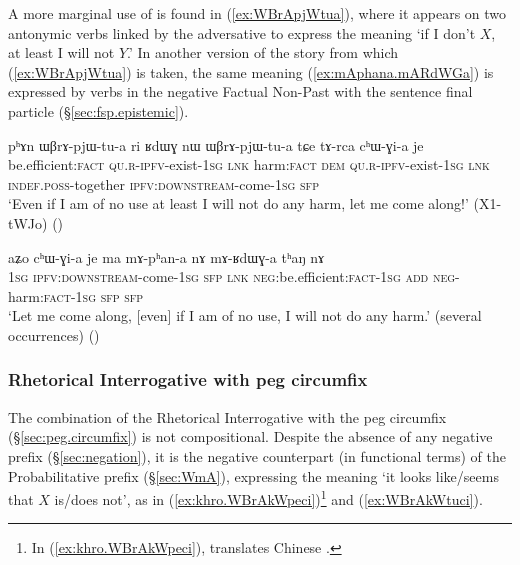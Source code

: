 A more marginal use of  is found in (\ref{ex:WBrApjWtua}), where it appears  on two antonymic verbs linked by the adversative  to express the meaning `if I don't $X$, at least I will not $Y$.' In another version of the story from which (\ref{ex:WBrApjWtua}) is taken, the same meaning (\ref{ex:mAphana.mARdWGa}) is expressed by verbs in the negative Factual Non-Past with the sentence final particle  (§\ref{sec:fsp.epistemic}).

 \begin{exe}
\ex \label{ex:WBrApjWtua}
\gll   pʰɤn ɯβrɤ-pjɯ-tu-a ri ʁdɯɣ nɯ ɯβrɤ-pjɯ-tu-a tɕe tɤ-rca cʰɯ-ɣi-a je \\
be.efficient:\textsc{fact} \textsc{qu}.\textsc{r}-\textsc{ipfv}-exist-\textsc{1sg} \textsc{lnk} harm:\textsc{fact} \textsc{dem} \textsc{qu}.\textsc{r}-\textsc{ipfv}-exist-\textsc{1sg}  \textsc{lnk} \textsc{indef}.\textsc{poss}-together \textsc{ipfv}:\textsc{downstream}-come-\textsc{1sg} \textsc{sfp} \\
\glt `Even if I am of no use at least I will not do any harm, let me come along!' (X1-tWJo)
()
\end{exe}

 \begin{exe}
\ex \label{ex:mAphana.mARdWGa}
\gll  aʑo cʰɯ-ɣi-a je ma mɤ-pʰan-a nɤ mɤ-ʁdɯɣ-a tʰaŋ nɤ \\
\textsc{1sg} \textsc{ipfv}:\textsc{downstream}-come-\textsc{1sg} \textsc{sfp} \textsc{lnk} \textsc{neg}:be.efficient:\textsc{fact}-\textsc{1sg} \textsc{add} \textsc{neg}-harm:\textsc{fact}-\textsc{1sg} \textsc{sfp} \textsc{sfp} \\
\glt `Let me come along, [even] if I am of no use, I will not do any harm.' (several occurrences)
()
\end{exe}

\subsubsection{Rhetorical Interrogative with peg circumfix} \label{sec:WBrA.kW.ci}
The combination of the Rhetorical Interrogative with the peg circumfix (§\ref{sec:peg.circumfix}) is not compositional. Despite the absence of any negative prefix (§\ref{sec:negation}), it is the negative counterpart (in functional terms) of the Probabilitative prefix (§\ref{sec:WmA}), expressing the meaning `it looks like/seems that $X$ is/does not', as in (\ref{ex:khro.WBrAkWpeci})\footnote{In (\ref{ex:khro.WBrAkWpeci}),  translates Chinese . } and (\ref{ex:WBrAkWtuci}).


